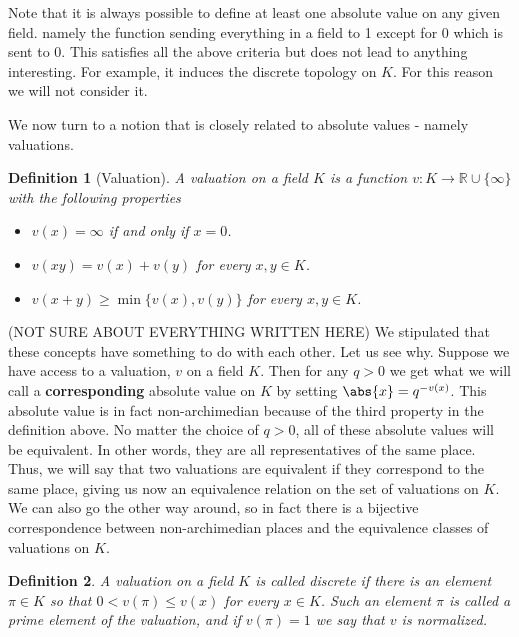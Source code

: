 \documentclass{article}
\newtheorem{definition}{Definition}[section]
\newcommand{\mbb}[1]{\mathbb{#1}}
\begin{document}
Note that it is always possible to define at least one absolute value on any given field. namely the function sending everything in a field to 1 except for 0 which is sent to 0. This satisfies all the above criteria but does not lead to anything interesting. For example, it induces the discrete topology on $K$. For this reason we will not consider it. 

We now turn to a notion that is closely related to absolute values - namely valuations. 

\begin{definition}[Valuation]
    A valuation on a field $K$ is a function $v : K \to \mbb R \cup \{\infty\}$ with the following properties 
    \begin{itemize}
        \item $v(x) = \infty$ if and only if $x = 0$.
        \item $v(xy) = v(x) + v(y)$ for every $x,y \in K$. 
        \item $v(x + y) \geq \min \{v(x), v(y)\}$ for every $x,y \in K$.
    \end{itemize}
\end{definition}

(NOT SURE ABOUT EVERYTHING WRITTEN HERE)
We stipulated that these concepts have something to do with each other. Let us see why. Suppose we have access to a valuation, $v$ on a field $K$. Then for any $q > 0$ we get what we will call a \textbf{corresponding} absolute value on $K$ by setting $\abs{x} = q^{-v(x)}$. This absolute value is in fact non-archimedian because of the third property in the definition above. No matter the choice of $q > 0$, all of these absolute values will be equivalent. In other words, they are all representatives of the same place. Thus, we will say that two valuations are equivalent if they correspond to the same place, giving us now an equivalence relation on the set of valuations on $K$. We can also go the other way around, so in fact there is a bijective correspondence between non-archimedian places and the equivalence classes of valuations on $K$.

\begin{definition}
    A valuation on a field $K$ is called discrete if there is an element $\pi \in K$ so that $0 < v(\pi) \leq v(x)$ for every $x \in K$. Such an element $\pi$ is called a prime element of the valuation, and if $v(\pi) = 1$ we say that $v$ is normalized. 
\end{definition}
\end{document}

